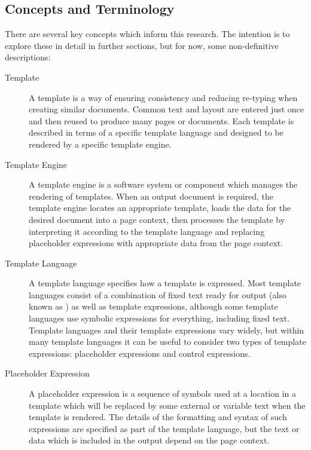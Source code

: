 \subsection{Concepts and Terminology}

There are several key concepts which inform this research. The intention is to explore these in detail in further sections, but for now, some non-definitive descriptions:

\begin{description}
\item[Template] 

A template is a way of ensuring consistency and reducing re-typing when creating similar documents. Common text and layout are entered just once and then reused to produce many pages or documents. Each template is described in terms of a specific template language and designed to be rendered by a specific template engine.

\item[Template Engine] 

A template engine is a software system or component which manages the rendering of templates. When an output document is required, the template engine locates an appropriate template, loads the data for the desired document into a page context, then processes the template by interpreting it according to the template language and replacing placeholder expressions with appropriate data from the page context. 

\item[Template Language] 

A template language specifies how a template is expressed. Most template languages consist of a combination of fixed text ready for output (also known as ) as well as template expressions, although some template languages use symbolic expressions for everything, including fixed text. Template languages and their template expressions vary widely, but within many template languages it can be useful to consider two types of template expressions: placeholder expressions and control expressions.


\item[Placeholder Expression] 

A placeholder expression is a sequence of symbols used at a location in a template which will be replaced by some external or variable text when the template is rendered. The details of the formatting and syntax of such expressions are specified as part of the template language, but the text or data which is included in the output depend on the page context.


\end{description}
